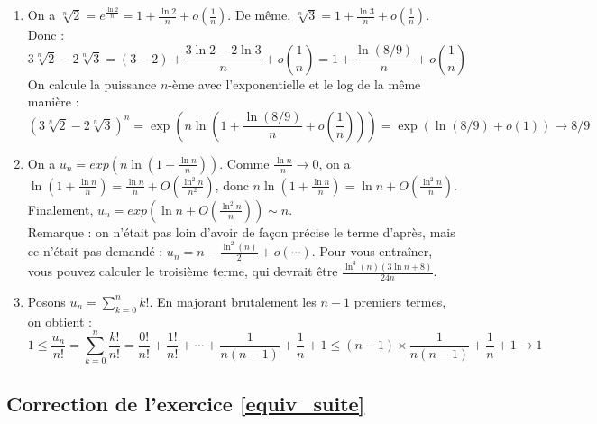 \documentclass[11pt,a4paper]{article}
\begin{document}
\begin{enumerate}
\item On a $\sqrt[n]{2} = e^{\frac{\ln 2}{n}} = 1+\frac{\ln 2}{n} + o\left(\frac{1}{n}\right)$. De même, $\sqrt[n]{3} =1+\frac{\ln 3}{n}  +  o\left(\frac{1}{n}\right)$. Donc : 
\[ 3\sqrt[n]{2}  - 2\sqrt[n]{3}  
= (3-2) + \frac{3\ln 2 - 2\ln 3}{n} +o\left(\frac{1}{n}\right)
= 1+ \frac{\ln(8/9)}{n} + o\left(\frac{1}{n}\right)
\]
On calcule la puissance $n$-ème avec l'exponentielle et le log de la même manière : 
\[
(3\sqrt[n]{2} - 2\sqrt[n]{3})^n
= \exp\left( n \ln \left( 1+ \frac{\ln(8/9)}{n} + o\left(\frac{1}{n}\right) \right) \right)
= \exp(\ln(8/9)+o(1) ) \to 8/9
\]
\item On a $u_n = exp\left(n\ln\left(1+\frac{\ln n}{n}\right)\right)$. Comme $\frac{\ln n}{n} \to 0$, on a $\ln\left(1+\frac{\ln n}{n}\right) = \frac{\ln n}{n} + O\left(\frac{\ln^2 n}{n^2}\right)$, donc $n\ln\left(1+\frac{\ln n}{n}\right) = \ln n + O\left(\frac{\ln^2 n}{n}\right)$. 
Finalement, $u_n = exp\left( \ln n + O\left(\frac{\ln^2 n}{n}\right) \right) \sim n$.\\
Remarque : on n'était pas loin d'avoir de façon précise le terme d'après, mais ce n'était pas demandé  : $u_n = n- \frac{\ln^2(n)}{2} + o(\cdots)$. 
Pour vous entraîner, vous pouvez calculer le troisième terme, qui devrait être $\frac{\ln^3(n)(3\ln n + 8)}{24n}$.
\item Posons $u_n = \sum_{k=0}^n k!$.
En majorant brutalement les $n-1$ premiers termes, on obtient :
\[ 
1 \leq \frac{u_n}{n!} = \sum_{k=0}^n\frac{k!}{n!} 
= \frac{0!}{n!} 
+ \frac{1!}{n!}
+ \cdots
+ \frac{1}{n(n-1)}
+ \frac{1}{n}
+ 1
\leq 
(n-1)\times \frac{1}{n(n-1)} + \frac{1}{n} + 1 \to 1\] 
\end{enumerate}

\subsection*{Correction de l'exercice \ref{equiv_suite}}
\end{document}
